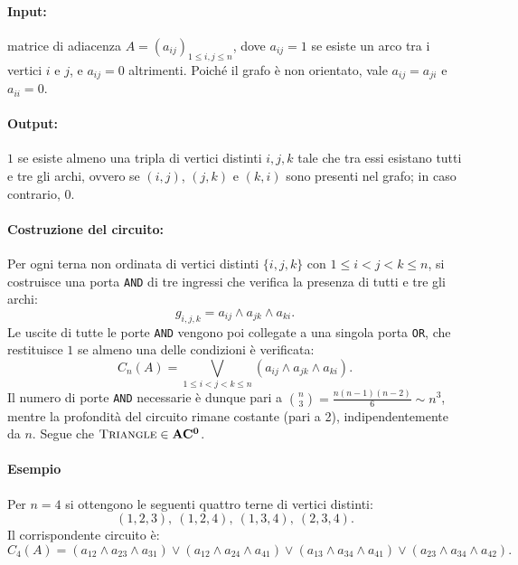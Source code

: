\documentclass[a4paper,12pt]{report}
\theoremstyle{propositionstyle}
\begin{document}
    \paragraph{Input:}
    matrice di adiacenza $A = (a_{ij})_{1 \leq i,j \leq n}$, dove $a_{ij} = 1$ se esiste un arco tra i vertici $i$ e $j$, e $a_{ij} = 0$ altrimenti.
    Poiché il grafo è non orientato, vale $a_{ij} = a_{ji}$ e $a_{ii} = 0$.

    \paragraph{Output:}
    $1$ se esiste almeno una tripla di vertici distinti $i,j,k$ tale che tra essi esistano tutti e tre gli archi,
    ovvero se $(i,j)$, $(j,k)$ e $(k,i)$ sono presenti nel grafo; in caso contrario, $0$.

    \paragraph{Costruzione del circuito:}
    Per ogni terna non ordinata di vertici distinti $\{i,j,k\}$ con $1 \leq i < j < k \leq n$, si costruisce una porta \texttt{AND} di tre ingressi che verifica la presenza di tutti e tre gli archi:
    \[
        g_{i,j,k} = a_{ij} \wedge a_{jk} \wedge a_{ki}.
    \]
    Le uscite di tutte le porte \texttt{AND} vengono poi collegate a una singola porta \texttt{OR}, che restituisce $1$ se almeno una delle condizioni è verificata:
    \[
        C_n(A) = \bigvee_{1 \leq i < j < k \leq n} (a_{ij} \wedge a_{jk} \wedge a_{ki}).
    \]
    Il numero di porte \texttt{AND} necessarie è dunque pari a $\binom{n}{3} = \frac{n(n-1)(n-2)}{6} \sim n^3$, mentre la profondità del circuito rimane costante (pari a 2), indipendentemente da $n$.
    Segue che $\textsc{Triangle} \in \mathbf{AC^0}$.

    \paragraph{Esempio}
    Per $n = 4$ si ottengono le seguenti quattro terne di vertici distinti:
    \[
        (1,2,3),\ (1,2,4),\ (1,3,4),\ (2,3,4).
    \]
    Il corrispondente circuito è:
    \[
        C_4(A) =
        (a_{12}\wedge a_{23}\wedge a_{31})
        \vee
        (a_{12}\wedge a_{24}\wedge a_{41})
        \vee
        (a_{13}\wedge a_{34}\wedge a_{41})
        \vee
        (a_{23}\wedge a_{34}\wedge a_{42}).
    \]
\end{document}
